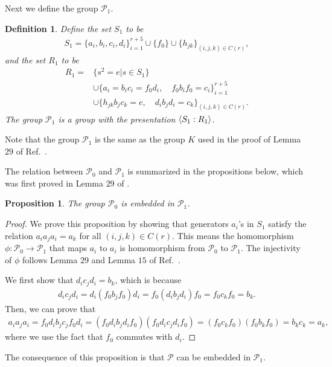 \documentclass[11pt,letterpaper]{article}
\DeclarePairedDelimiter{\ip}{\langle}{\rangle}
\newcommand{\1}{\mathbb{1}}
\newcommand{\Pg}{\mathcal{P}}
\newtheorem{proposition}[theorem]{Proposition}
\newtheorem{definition}[theorem]{Definition}
\theoremstyle{definition}
\begin{document}
Next we define the group $\Pg_1$.
\begin{definition}
\label{def:g1}
Define the set $S_1$ to be
\begin{align*}
	S_1 = \{a_i, b_i, c_i, d_i\}_{i=1}^{r+5} \cup \{ f_0 \} \cup \{h_{jk}\}_{(i,j,k) \in C(r)},
\end{align*}
and the set $R_1$ to be
\begin{align*}
	R_1 = &\{ s^2 = e \vert s \in S_1\}\\ 
	&\cup 
	\{a_i = b_ic_i = f_0d_i, \quad f_0b_if_0 =c_i\}_{i= 1}^{r+5} \\ 
	&\cup
	\{h_{jk}b_j c_k = e, \quad d_ib_jd_i = c_k\}_{(i,j,k) \in C(r)}.
\end{align*}
The group $\Pg_1$ is a group with the presentation $\ip{S_1 : R_1}$.
\end{definition}
Note that the group $\Pg_1$ is the same as the group $K$ used in the proof of Lemma $29$ of Ref.~\cite{slofstra2017}.

The relation between $\Pg_0$ and $\Pg_1$ is summarized in the propositions below, which was first proved in Lemma $29$ of \cite{slofstra2017}.
\begin{proposition}
    \label{prop:g0g1}
	The group $\Pg_0$ is embedded in $\Pg_1$. 
\end{proposition}
\begin{proof}
    We prove this proposition by showing that generators $a_i$'s in $S_1$
    satisfy the relation $a_i a_j a_i = a_k$ for all $(i,j,k) \in C(r)$.
    This means the homomorphism $\phi: \Pg_0 \rightarrow \Pg_1$ that maps $a_i$
    to $a_i$ is homomorphism from $\Pg_0$ to $\Pg_1$. 
    The injectivity of $\phi$ follows Lemma $29$ and Lemma $15$ of Ref.~\cite{slofstra2017}.
    
	We first show that $d_i c_j d_i = b_k$, which is because
	\begin{align*}
		d_i c_j d_i = d_i (f_0 b_j f_0) d_i = f_0 (d_i b_j d_i) f_0 = f_0 c_k f_0 = b_k.
	\end{align*}
	Then, we can prove that 
	\begin{align*}
		a_i a_j a_i = f_0 d_i b_j c_j f_0 d_i 
		= (f_0 d_i b_j d_i f_0)(f_0 d_i c_j d_i f_0) 
		= (f_0 c_k f_0)(f_0 b_k f_0) 
		= b_k c_k = a_k,
	\end{align*}
	where we use the fact that $f_0$ commutes with $d_i$.
\end{proof}
The consequence of this proposition is that $\Pg$ can be embedded in $\Pg_1$.
\end{document}
